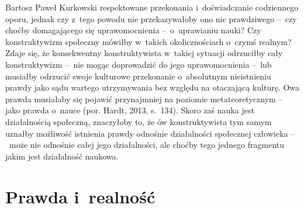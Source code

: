 \begin{artplenv}{Bartosz Paweł Kurkowski}
respektowane przekonania i~doświadczanie codziennego oporu, jednak czy z~tego powodu nie przekazywałoby ono nic
prawdziwego --~czy choćby domagającego się uprawomocnienia --~o~uprawianiu nauki? Czy konstruktywizm społeczny
mówiłby w~takich okolicznościach o~czymś realnym? Zdaje się, że konsekwentny konstruktywista w~takiej sytuacji odrzuciłby cały
konstruktywizm --~nie mogąc doprowadzić do jego uprawomocnienia --~lub musiałby odrzucić swoje kulturowe
przekonanie o~absolutnym nieistnieniu prawdy jako sądu wartego utrzymywania bez względu na otaczającą kulturę. Owa prawda musiałaby
się pojawić przynajmniej na poziomie metateoretycznym --~ jako prawda o~nauce \label{ref:RNDYgQXC7mKgS}(por. Hardt,
2013, s.~134). Skoro zaś nauka jest działalnością społeczną, znaczyłoby to, że ów konstruktywista tym samym uznałby
możliwość istnienia prawdy odnośnie działalności społecznej człowieka --~może nie odnośnie całej jego działalności, ale
choćby tego jednego fragmentu jakim jest działalność naukowa.

\section{Prawda i~realność}


\end{artplenv}
